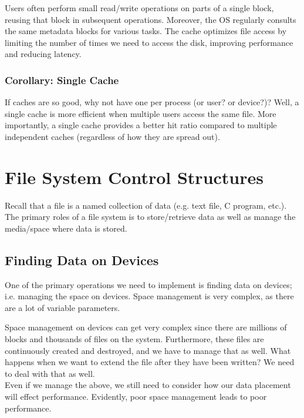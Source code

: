 \documentclass{report}
\newcommand{\exampleBegin}[1]{\begin{tcolorbox}[colback=blue!5!white,colframe=black!75!blue,title={Example:
      #1}]}
\newcommand{\exampleEnd}{\end{tcolorbox}}
\begin{document}
Users often perform small read/write operations on parts of a single block, reusing that block in
subsequent operations. Moreover, the OS regularly consults the same metadata blocks for various
tasks. The cache optimizes file access by limiting the number of times we need to access the disk,
improving performance and reducing latency.

\subsubsection{Corollary: Single Cache}
If caches are so good, why not have one per process (or user? or device?)? Well, a single cache is
more efficient when multiple users access the same file. More importantly, a single cache provides a
better hit ratio compared to multiple independent caches (regardless of how they are spread
out).





\section{File System Control Structures}
Recall that a file is a named collection of data (e.g. text file, C program, etc.). The primary
roles of a file system is to store/retrieve data as well as manage the media/space where data is
stored.





\subsection{Finding Data on Devices}
One of the primary operations we need to implement is finding data on devices; i.e. managing the
space on devices. Space management is very complex, as there are a lot of variable parameters.

\exampleBegin{Harder Tetris}
Space management on devices can get very complex since there are millions of blocks and thousands of
files on the system. Furthermore, these files are continuously created and destroyed, and we have to
manage that as well. What happens when we want to extend the file after they have been written? We
need to deal with that as well. \\

Even if we manage the above, we still need to consider how our data placement will effect
performance. Evidently, poor space management leads to poor performance.
\exampleEnd
\end{document}
